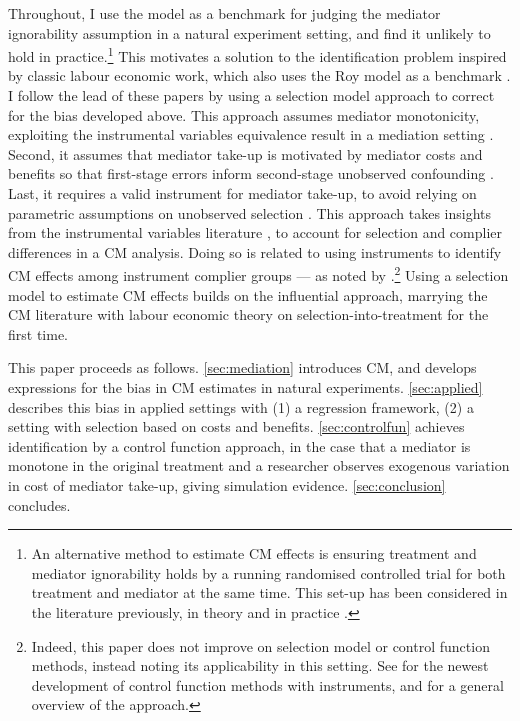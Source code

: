 Throughout, I use the \cite{roy1951some} model as a benchmark for judging the \cite{imai2010identification} mediator ignorability assumption in a natural experiment setting, and find it unlikely to hold in practice.\footnote{
    An alternative method to estimate CM effects is ensuring treatment and mediator ignorability holds by a running randomised controlled trial for both treatment and mediator at the same time.
    This set-up has been considered in the literature previously, in theory \citep{imai2013experimental,heckman2015experimental} and in practice \citep{ludwig2011mechanism,heckman2013understanding}.
}
This motivates a solution to the identification problem inspired by classic labour economic work, which also uses the Roy model as a benchmark \citep{heckman1979sample,heckman1990empirical}.
I follow the lead of these papers by using a selection model approach to correct for the bias developed above.
This approach assumes mediator monotonicity, exploiting the instrumental variables equivalence result in a mediation setting \citep{vytlacil2002independence}.
Second, it assumes that mediator take-up is motivated by mediator costs and benefits so that first-stage errors inform second-stage unobserved confounding \citep{florens2008identification}.
Last, it requires a valid instrument for mediator take-up, to avoid relying on parametric assumptions on unobserved selection \citep{heckman2004using}.
This approach takes insights from the instrumental variables literature \citep{kline2019heckits}, to account for selection and complier differences in a CM analysis.
Doing so is related to using instruments to identify CM effects among instrument complier groups --- as noted by \cite{frolich2017direct}.\footnote{
    Indeed, this paper does not improve on selection model or control function methods, instead noting its applicability in this setting.
    See \cite{frolich2017direct} for the newest development of control function methods with instruments, and \cite{imbens2007nonadditive} for a general overview of the approach.
}
Using a selection model to estimate CM effects builds on the influential \cite{imai2010identification} approach, marrying the CM literature with labour economic theory on selection-into-treatment for the first time. 

This paper proceeds as follows.
\autoref{sec:mediation} introduces CM, and develops expressions for the bias in CM estimates in natural experiments.
\autoref{sec:applied} describes this bias in applied settings with (1) a regression framework, (2) a setting with selection based on costs and benefits.
\autoref{sec:controlfun} achieves identification by a control function approach,
in the case that a mediator is monotone in the original treatment and a researcher observes exogenous variation in cost of mediator take-up, giving simulation evidence.
\autoref{sec:conclusion} concludes.
